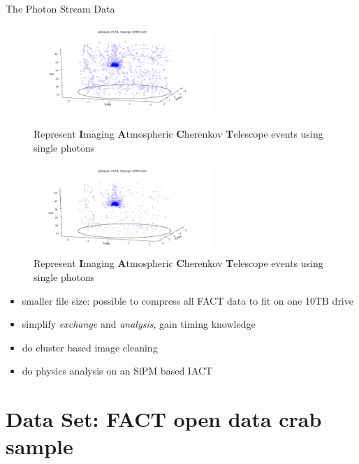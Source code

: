 \begin{frame}[t]{The Photon Stream Data}
    \begin{multicols}{2}
    \begin{figure}
        \centering
        \begin{overprint}
            \includegraphics[width=0.6\textwidth]{fig/event/example_event_small-14.png}
            \caption{Represent \textbf{I}maging \textbf{A}tmospheric \textbf{C}herenkov \textbf{T}elescope events using single photons}
            \includegraphics[width=0.6\textwidth]{fig/event/example_event_small-15.png}
            \caption{Represent \textbf{I}maging \textbf{A}tmospheric \textbf{C}herenkov \textbf{T}elescope events using single photons}
    \end{overprint}
    \end{figure}
    \columnbreak
    \begin{itemize}
        \item smaller file size: possible to compress all FACT data to fit on one 10TB drive 
        \item simplify \textit{exchange} and \textit{analysis}, gain timing knowledge
        \item do cluster based image cleaning
        \item do physics analysis on an SiPM based IACT    
    \end{itemize}
    \end{multicols}
\end{frame}



\section{Data Set: FACT open data crab sample}

